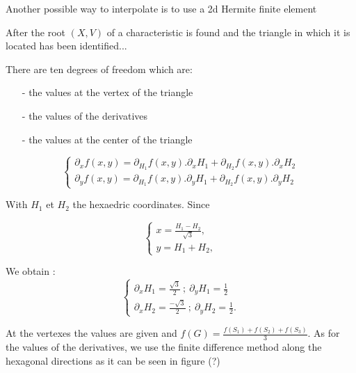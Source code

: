 \documentclass[11pt,a4paper]{amsart}
\begin{document}
Another possible way to interpolate is to use a 2d Hermite finite element \cite{zie}   

After the root $(X,V)$ of a characteristic is found and  the triangle in which it is located has been identified... 

There are ten degrees of freedom which are:
\begin{itemize}
\item[-] the values at the vertex of the triangle 
\item[-] the values of the derivatives 
\item[-] the values at the center of the triangle 
\end{itemize}



\begin{equation}
\begin{cases}  

\partial _x f(x,y) = \partial _{H_1} f(x,y).   \partial _x H_1 +   \partial _{H_2} f(x,y).   \partial _x H_2  \\
\partial _y f(x,y) = \partial _{H_1} f(x,y).   \partial _y H_1 +   \partial _{H_2} f(x,y).   \partial _y H_2             

\end{cases}
\end{equation}

With $H_1$ et $H_2$ the  hexaedric coordinates. Since   

\begin{equation}
\begin{cases}  

\displaystyle{x = \frac{ H_1 - H_2 }{\sqrt{3}} },  \\[2mm]
\displaystyle{y =  H_1 + H_2 },        

\end{cases}
\end{equation}

We obtain :
\begin{equation}
	\begin{cases}  
       \displaystyle{  \partial _x H_1 = \frac{\sqrt{3}}{ 2} ~;~  \partial _y H_1 = \frac{1}{ 2}  }\\[2mm]
       \displaystyle{  \partial _x H_2 = \frac{-\sqrt{3}}{2} ~;~  \partial _y H_2 = \frac{1}{ 2}  } . 
\end{cases}	
\end{equation}

At the vertexes the values are given and $f(G) = \frac{f(S_1)+f(S_2)+f(S_3)}{3}$. As for the values of the derivatives, we use the finite difference method along the hexagonal directions as it can be seen in figure (?)
\end{document}
